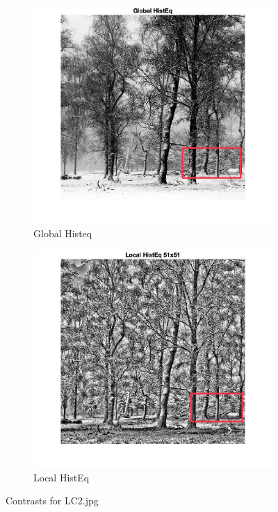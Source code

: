 \documentclass[12pt]{article}
\begin{document}
\begin{figure}[h!]
        \vspace{10pt} %
        
        \begin{subfigure}[b]{0.4\textwidth}
            \centering
            \includegraphics[width=\textwidth]{../images/LC2_globalHistEq_2.jpeg}
            \caption{Global Histeq}
        \end{subfigure}
        \hfill
        \begin{subfigure}[b]{0.4\textwidth}
            \centering
            \includegraphics[width=\textwidth]{../images/LC2_localHistEq_2.jpeg}
            \caption{Local HistEq}
        \end{subfigure}
    
        \caption{Contrasts for LC2.jpg}
    \end{figure}
\end{document}
